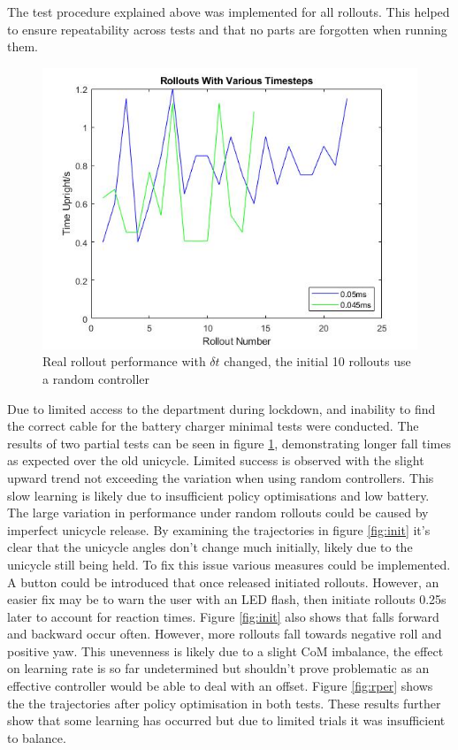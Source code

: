 \documentclass[twoside,twocolumn,12pt]{article}
\begin{document}
The test procedure explained above was implemented for all rollouts. This helped to ensure repeatability across tests and that no parts are forgotten when running them.
\begin{figure}
  \centering
    \includegraphics[width=\linewidth]{summary}
  \caption{Real rollout performance with $\delta t$ changed, the initial 10 rollouts use a random controller}
  \label{fig:rsum}
\end{figure} 
Due to limited access to the department during lockdown, and inability to find the correct cable for the battery charger minimal tests were conducted. The results of two partial tests can be seen in figure \ref{fig:rsum}, demonstrating longer fall times as expected over the old unicycle. Limited success is observed with the slight upward trend not exceeding the variation when using random controllers. This slow learning is likely due to insufficient policy optimisations and low battery. The large variation in performance under random rollouts could be caused by imperfect unicycle release. By examining the trajectories in figure \ref{fig:init} it's clear that the unicycle angles don't change much initially, likely due to the unicycle still being held. To fix this issue various measures could be implemented. A button could be introduced that once released initiated rollouts. However, an easier fix may be to warn the user with an LED flash, then initiate rollouts 0.25s later to account for reaction times.
\newline
Figure \ref{fig:init} also shows that falls forward and backward occur often. However, more rollouts fall towards negative roll and positive yaw. This unevenness is likely due to a slight CoM imbalance, the effect on learning rate is so far undetermined but shouldn't prove problematic as an effective controller would be able to deal with an offset. 
\newline
Figure \ref{fig:rper} shows the the trajectories after policy optimisation in both tests. These results further show that some learning has occurred but due to limited trials it was insufficient to balance.
\end{document}
